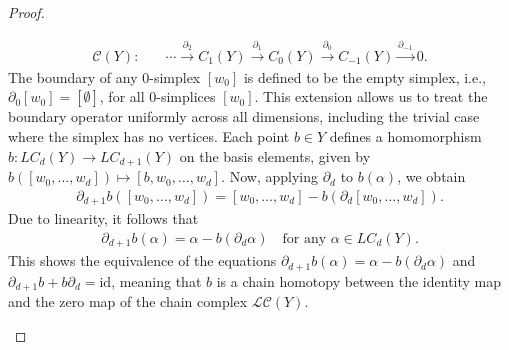 \begin{proof}
\begin{enumerate}
\begin{align}
		\mathcal{C}(Y): &\quad \cdots \xrightarrow{\partial_{2}} C_{1}(Y) \xrightarrow{\partial_{1}} C_0(Y) \xrightarrow{\partial_{0}} C_{-1}(Y) \xrightarrow{\partial_{-1}} 0.
	\end{align}
	The boundary of any \(0\)-simplex \([w_0]\) is defined to be the empty simplex, i.e., $\partial_0[w_0] = [\emptyset]$, for all \(0\)-simplices \([w_0]\). This extension allows us to treat the boundary operator uniformly across all dimensions, including the trivial case where the simplex has no vertices. Each point \(b \in Y\) defines a homomorphism \(b: LC_d(Y) \rightarrow LC_{d+1}(Y)\) on the basis elements, given by $b([w_0, \ldots, w_d]) \mapsto [b, w_0, \ldots, w_d]$. Now, applying \(\partial_d\) to \(b(\alpha)\), we obtain
	\begin{align}
		\partial_{d+1} b([w_0, \ldots, w_d]) = [w_0, \ldots, w_d] - b(\partial_d [w_0, \ldots, w_d]). 
	\end{align}
	Due to linearity, it follows that 
	\begin{align}
		\partial_{d+1} b(\alpha) = \alpha - b(\partial_d \alpha) \quad \text{for any } \alpha \in LC_d(Y). 
	\end{align}
	This shows the equivalence of the equations \(\partial_{d+1} b(\alpha) = \alpha - b(\partial_d \alpha)\) and \(\partial_{d+1} b + b \partial_d = \text{id}\), meaning that \(b\) is a chain homotopy between the identity map and the zero map of the chain complex \(\mathcal{LC}(Y)\).
		

\end{enumerate}
\end{proof}

